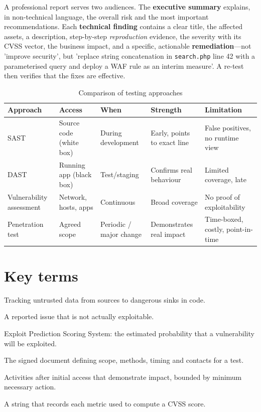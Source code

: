 \documentclass[11pt,openany]{book}
\begin{document}
A professional report serves two audiences. The \textbf{executive summary} explains, in non-technical language, the overall risk and the most important recommendations. Each \textbf{technical finding} contains a clear title, the affected assets, a description, step-by-step \emph{reproduction} evidence, the severity with its CVSS vector, the business impact, and a specific, actionable \textbf{remediation}—not 'improve security', but 'replace string concatenation in \texttt{search.php} line 42 with a parameterised query and deploy a WAF rule as an interim measure'. A re-test then verifies that the fixes are effective.

\begin{table}[htbp]
  \centering\small
  \caption{Comparison of testing approaches}
  \begin{tabularx}{\linewidth}{>{\raggedright\arraybackslash}X >{\raggedright\arraybackslash}X >{\raggedright\arraybackslash}X >{\raggedright\arraybackslash}X >{\raggedright\arraybackslash}X}
    \toprule
    \textbf{Approach} & \textbf{Access} & \textbf{When} & \textbf{Strength} & \textbf{Limitation} \\
    \midrule
    SAST & Source code (white box) & During development & Early, points to exact line & False positives, no runtime view \\
    DAST & Running app (black box) & Test/staging & Confirms real behaviour & Limited coverage, late \\
    Vulnerability assessment & Network, hosts, apps & Continuous & Broad coverage & No proof of exploitability \\
    Penetration test & Agreed scope & Periodic / major change & Demonstrates real impact & Time-boxed, costly, point-in-time \\
    \bottomrule
  \end{tabularx}
\end{table}
\section*{Key terms}
\begin{description}[style=nextline,leftmargin=1.2em]
  \item[Taint analysis] Tracking untrusted data from sources to dangerous sinks in code.
  \item[False positive] A reported issue that is not actually exploitable.
  \item[EPSS] Exploit Prediction Scoring System: the estimated probability that a vulnerability will be exploited.
  \item[Rules of engagement] The signed document defining scope, methods, timing and contacts for a test.
  \item[Post-exploitation] Activities after initial access that demonstrate impact, bounded by minimum necessary action.
  \item[CVSS vector] A string that records each metric used to compute a CVSS score.
\end{description}
\end{document}
